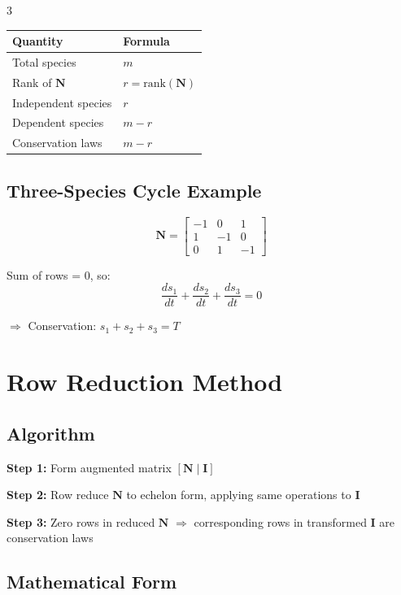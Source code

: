 \documentclass[10pt,landscape,a4paper]{article}
\begin{document}
\begin{multicols}{3}
\begin{center}
\small
\begin{tabular}{@{}ll@{}}
\toprule
\textbf{Quantity} & \textbf{Formula} \\
\midrule
Total species & $m$ \\
Rank of $\mathbf{N}$ & $r = \text{rank}(\mathbf{N})$ \\
Independent species & $r$ \\
Dependent species & $m - r$ \\
Conservation laws & $m - r$ \\
\bottomrule
\end{tabular}
\end{center}

\subsection{Three-Species Cycle Example}

\[
\mathbf{N} = \begin{bmatrix}
-1 & 0 & 1 \\
1 & -1 & 0 \\
0 & 1 & -1
\end{bmatrix}
\]

Sum of rows = 0, so:
\[ \frac{ds_1}{dt} + \frac{ds_2}{dt} + \frac{ds_3}{dt} = 0 \]

$\Rightarrow$ Conservation: $s_1 + s_2 + s_3 = T$

\section{Row Reduction Method}

\subsection{Algorithm}

\textbf{Step 1:} Form augmented matrix $[\mathbf{N} \mid \mathbf{I}]$

\textbf{Step 2:} Row reduce $\mathbf{N}$ to echelon form, applying same operations to $\mathbf{I}$

\textbf{Step 3:} Zero rows in reduced $\mathbf{N}$ $\Rightarrow$ corresponding rows in transformed $\mathbf{I}$ are conservation laws

\subsection{Mathematical Form}


\end{multicols}
\end{document}
